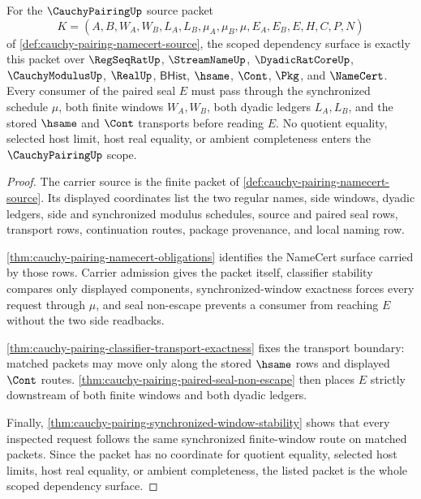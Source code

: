 \begin{theorem}
\label{thm:cauchy-pairing-scoped-dependency-package}
For the $\CauchyPairingUp$ source packet
$$
K=(A,B,W_A,W_B,L_A,L_B,\mu_A,\mu_B,\mu,E_A,E_B,E,H,C,P,N)
$$
of \autoref{def:cauchy-pairing-namecert-source}, the scoped dependency surface is exactly this packet over $\RegSeqRatUp$, $\StreamNameUp$, $\DyadicRatCoreUp$, $\CauchyModulusUp$, $\RealUp$, $\mathsf{BHist}$, $\hsame$, $\Cont$, $\Pkg$, and $\NameCert$. Every consumer of the paired seal $E$ must pass through the synchronized schedule $\mu$, both finite windows $W_A,W_B$, both dyadic ledgers $L_A,L_B$, and the stored $\hsame$ and $\Cont$ transports before reading $E$. No quotient equality, selected host limit, host real equality, or ambient completeness enters the $\CauchyPairingUp$ scope.
\end{theorem}
\begin{proof}
The carrier source is the finite packet of \autoref{def:cauchy-pairing-namecert-source}. Its displayed coordinates list the two regular names, side windows, dyadic ledgers, side and synchronized modulus schedules, source and paired seal rows, transport rows, continuation routes, package provenance, and local naming row.

\autoref{thm:cauchy-pairing-namecert-obligations} identifies the NameCert surface carried by those rows. Carrier admission gives the packet itself, classifier stability compares only displayed components, synchronized-window exactness forces every request through $\mu$, and seal non-escape prevents a consumer from reaching $E$ without the two side readbacks.

\autoref{thm:cauchy-pairing-classifier-transport-exactness} fixes the transport boundary: matched packets may move only along the stored $\hsame$ rows and displayed $\Cont$ routes. \autoref{thm:cauchy-pairing-paired-seal-non-escape} then places $E$ strictly downstream of both finite windows and both dyadic ledgers.

Finally, \autoref{thm:cauchy-pairing-synchronized-window-stability} shows that every inspected request follows the same synchronized finite-window route on matched packets. Since the packet has no coordinate for quotient equality, selected host limits, host real equality, or ambient completeness, the listed packet is the whole scoped dependency surface.
\end{proof}

